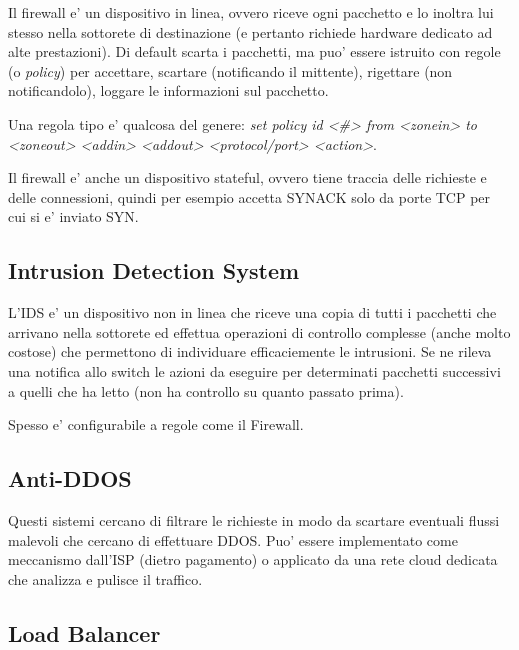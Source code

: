 Il firewall e' un dispositivo in linea, ovvero riceve ogni pacchetto e lo inoltra lui stesso nella sottorete di destinazione (e pertanto richiede hardware dedicato ad alte prestazioni). Di default scarta i pacchetti, ma puo' essere istruito con regole (o \textit{policy}) per accettare, scartare (notificando il mittente), rigettare (non notificandolo), loggare le informazioni sul pacchetto.

Una regola tipo e' qualcosa del genere: \textit{set policy id <\#> from <zonein> to <zoneout> <addin> <addout> <protocol/port> <action>}.

Il firewall e' anche un dispositivo stateful, ovvero tiene traccia delle richieste e delle connessioni, quindi per esempio accetta SYNACK solo da porte TCP per cui si e' inviato SYN.


\subsection{Intrusion Detection System}

L'IDS e' un dispositivo non in linea che riceve una copia di tutti i pacchetti che arrivano nella sottorete ed effettua operazioni di controllo complesse (anche molto costose) che permettono di individuare efficaciemente le intrusioni. Se ne rileva una notifica allo switch le azioni da eseguire per determinati pacchetti successivi a quelli che ha letto (non ha controllo su quanto passato prima).


Spesso e' configurabile a regole come il Firewall.


\subsection{Anti-DDOS}

Questi sistemi cercano di filtrare le richieste in modo da scartare eventuali flussi malevoli che cercano di effettuare DDOS. Puo' essere implementato come meccanismo dall'ISP (dietro pagamento) o applicato da una rete cloud dedicata che analizza e pulisce il traffico.


\subsection{Load Balancer}

